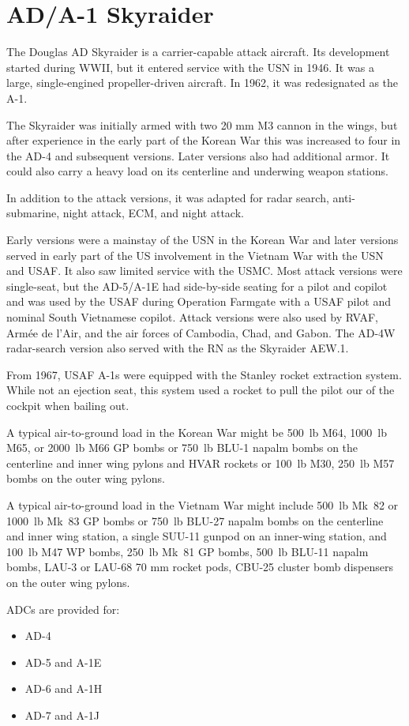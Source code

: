 \section*{AD/A-1 Skyraider}

The Douglas AD Skyraider is a carrier-capable attack aircraft. Its development started during WWII, but it entered service with the USN in 1946. It was a large, single-engined propeller-driven aircraft. In 1962, it was redesignated as the A-1.

The Skyraider was initially armed with two 20 mm M3 cannon in the wings, but after experience in the early part of the Korean War this was increased to four in the AD-4 and subsequent versions. Later versions also had additional armor. It could also carry a heavy load on its centerline and underwing weapon stations.

In addition to the attack versions, it was adapted for radar search, anti-submarine, night attack, ECM, and night attack.

Early versions were a mainstay of the USN in the Korean War and later versions served in early part of the US involvement in the Vietnam War with the USN and USAF. It also saw limited service with the USMC. Most attack versions were single-seat, but the AD-5/A-1E had side-by-side seating for a pilot and copilot and was used by the USAF during Operation Farmgate with a USAF pilot and nominal South Vietnamese copilot. Attack versions were also used by RVAF, Armée de l'Air, and the air forces of Cambodia, Chad, and Gabon. The AD-4W radar-search version also served with the RN as the Skyraider AEW.1.

From 1967, USAF A-1s were equipped with the Stanley rocket extraction system. While not an ejection seat, this system used a rocket to pull the pilot our of the cockpit when bailing out.

A typical air-to-ground load in the Korean War might be 500~lb M64, 1000~lb M65, or 2000~lb M66 GP bombs or 750~lb BLU-1 napalm bombs on the centerline and inner wing pylons and HVAR rockets or 100~lb M30, 250~lb M57 bombs on the outer wing pylons.

A typical air-to-ground load in the Vietnam War might include 500~lb Mk~82 or 1000~lb Mk~83 GP bombs or 750~lb BLU-27 napalm bombs on the centerline and inner wing station, a single SUU-11 gunpod on an inner-wing station, and 100~lb M47 WP bombs, 250~lb Mk~81 GP bombs, 500~lb BLU-11 napalm bombs, LAU-3 or LAU-68 70 mm rocket pods, CBU-25 cluster bomb dispensers on the outer wing pylons.

ADCs are provided for:
\begin{itemize}
    \item AD-4
    \item AD-5 and A-1E
    \item AD-6 and A-1H
    \item AD-7 and A-1J
\end{itemize}